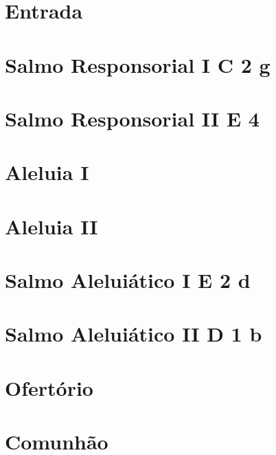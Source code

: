 \documentclass[a4paper]{memoir}
\title{\mytitle}
\author{}
\date{}
\begin{document}
\maketitle

\section{Entrada}

\section[Salmo Responsorial I]{Salmo Responsorial I \textmd{C 2 g}}\label{subsection:tempus-per-annum/missa-6/psalmus-responsorius-1}

\section[Salmo Responsorial II]{Salmo Responsorial II \textmd{E 4}}\label{subsection:tempus-per-annum/missa-6/psalmus-responsorius-2}

\section{Aleluia I}\label{subsection:tempus-per-annum/missa-6/alleluia-1}

\section{Aleluia II}\label{subsection:tempus-per-annum/missa-6/alleluia-2}

\section[Salmo Aleluiático I]{Salmo Aleluiático I \textmd{E 2 d}}\label{subsection:tempus-per-annum/missa-6/psalmus-alleluiaticus-1}

\section[Salmo Aleluiático II]{Salmo Aleluiático II \textmd{D 1 b}}\label{subsection:tempus-per-annum/missa-6/psalmus-alleluiaticus-2}

\AllowPageFlush

\section{Ofertório}

\section{Comunhão}
\end{document}
